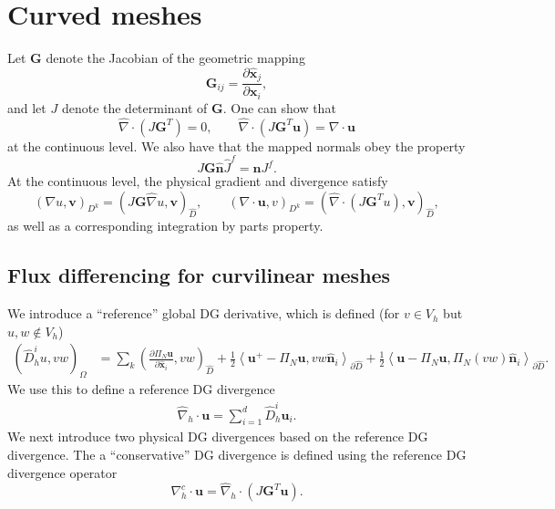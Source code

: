 \documentclass[preprint,10pt]{article}
\theoremstyle{definition}
\theoremstyle{lemma}
\theoremstyle{theorem}
\theoremstyle{assumption}
\renewcommand{\hat}{\widehat}
\newcommand{\pd}[2]{\frac{\partial#1}{\partial#2}}
\newcommand{\LRp}[1]{\left( #1 \right)}
\newcommand{\LRa}[1]{\left\langle #1 \right\rangle}
\newcommand{\Grad} {\ensuremath{\nabla}}
\renewcommand{\d}{\partial}
\begin{document}
\section{Curved meshes}

Let $\bm{G}$ denote the Jacobian of the geometric mapping
\[
\bm{G}_{ij} = \pd{\hat{\bm{x}}_j}{\bm{x}_i},
\]
and let $J$ denote the determinant of $\bm{G}$.  One can show that
\[
\hat{\Grad} \cdot \LRp{J\bm{G}^T} = 0, \qquad \hat{\Grad} \cdot \LRp{J\bm{G}^T\bm{u}} = \Grad \cdot \bm{u}
\]
at the continuous level.  We also have that the mapped normals obey the property
\[
J\bm{G} \hat{\bm{n}}\hat{J}^f = \bm{n}J^f.
\]
At the continuous level, the physical gradient and divergence satisfy
\[
\LRp{\Grad u, \bm{v}}_{D^k} = \LRp{J\bm{G} \hat{\Grad} u,\bm{v}}_{\hat{D}}, \qquad \LRp{\Grad\cdot \bm{u},v}_{D^k} = \LRp{\hat{\Grad}\cdot \LRp{J\bm{G}^T u},\bm{v}}_{\hat{D}}, 
\]
as well as a corresponding integration by parts property.  

\subsection{Flux differencing for curvilinear meshes}

We introduce a ``reference'' global DG derivative, which is defined (for $v\in V_h$ but $u,w\not\in V_h$)
\begin{align*}
\LRp{\hat{D}^i_h u,vw}_{\Omega} &= \sum_k \LRp{\pd{\Pi_N\bm{u}}{\hat{\bm{x}}_i},vw}_{\hat{D}} 
 + \frac{1}{2}\LRa{ \bm{u}^+ - \Pi_N\bm{u},vw\hat{\bm{n}}_i}_{\d \hat{D}} +  \frac{1}{2}\LRa{ \bm{u} - \Pi_N\bm{u},\Pi_N\LRp{vw}\hat{\bm{n}}_i}_{\d \hat{D}}.
\end{align*}
We use this to define a reference DG divergence
\begin{align*}
\hat{\Grad}_h \cdot \bm{u} = \sum_{i=1}^d \hat{D}^i_h \bm{u}_i.
\end{align*}
We next introduce two physical DG divergences based on the reference DG divergence.  The a ``conservative'' DG divergence is defined using the reference DG divergence operator
\[
\Grad^c_h \cdot \bm{u} = \hat{\Grad}_h \cdot \LRp{J\bm{G}^T\bm{u}}.  
\]
\end{document}
